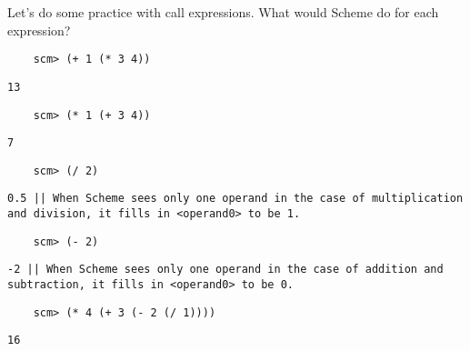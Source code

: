 \begin{blocksection}
Let's do some practice with call expressions. What would Scheme do for each expression?

\begin{lstlisting}
    scm> (+ 1 (* 3 4))
\end{lstlisting}
\begin{solution}[.25in]
    \texttt{13}
\end{solution}

\begin{lstlisting}
    scm> (* 1 (+ 3 4))
\end{lstlisting}
\begin{solution}[.25in]
    \texttt{7}
\end{solution}

\begin{lstlisting}
    scm> (/ 2)
\end{lstlisting}
\begin{solution}[.25in]
    \texttt{0.5 || When Scheme sees only one operand in the case of multiplication and division, it fills in <operand0> to be 1.}
\end{solution}

\begin{lstlisting}
    scm> (- 2)
\end{lstlisting}
\begin{solution}[.25in]
    \texttt{-2 || When Scheme sees only one operand in the case of addition and subtraction, it fills in <operand0> to be 0.}
\end{solution}

\begin{lstlisting}
    scm> (* 4 (+ 3 (- 2 (/ 1))))
\end{lstlisting}
\begin{solution}[.25in]
    \texttt{16}
\end{solution}
\end{blocksection}